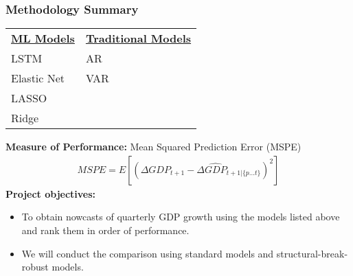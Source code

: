 \begin{frame}[t]
\frametitle{Methodology Summary}
    \begin{table}[]
        \begin{tabular}{l | l}
        \underline{\textbf{ML Models}}&\underline{\textbf{Traditional Models}}\\
        LSTM&AR\\
        Elastic Net&VAR\\
        LASSO&\\
        Ridge&\\
        \end{tabular}
    \end{table}
\vspace{10pt}
\textbf{Measure of Performance:} Mean Squared Prediction Error (MSPE)
\begin{align*}
MSPE = E\left[ ({\Delta GDP}_{t+1} - {\Delta \hat{GDP}}_{t+1|\{p \ldots t\}})^2 \right]
\end{align*}
\vspace{10pt}
\textbf{Project objectives:}
    \begin{itemize}
        \item To obtain nowcasts of quarterly GDP growth using the models listed above and rank them in order of performance. 
        \item We will conduct the comparison using standard models and structural-break-robust models.
    \end{itemize}
\end{frame}